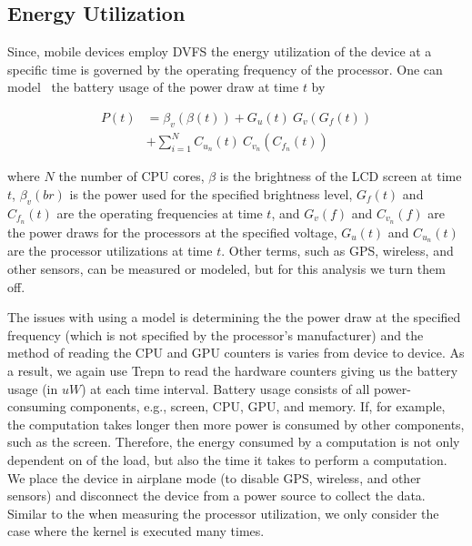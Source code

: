 \subsection{Energy Utilization}


Since, mobile devices employ DVFS
  the energy utilization of the device at a specific time is governed by
  the operating frequency of the processor.
One can model~\cite{zhang2010accurate, dong2011self} the battery usage of the power draw at time $t$ by

\begin{align*}
P(t) &= \beta_v(\beta(t)) + G_u(t) ~ G_v(G_f(t)) \\
     &+ \sum_{i=1}^{N} C_{u_n}(t) ~ C_{v_n}(C_{f_n}(t))
\end{align*}

where $N$ the number of CPU cores, $\beta$ is the brightness of the LCD screen at time $t$, $\beta_v(br)$ is the power used for the specified brightness level, $G_f(t)$ and $C_{f_n}(t)$ are the operating frequencies at time $t$, and $G_v(f)$ and $ C_{v_n}(f)$ are the power draws for the processors at the specified voltage, $G_u(t)$ and $C_{u_n}(t)$ are the processor utilizations at time $t$.
Other terms, such as GPS, wireless, and other sensors, can be measured or modeled, but for this analysis we turn them off.

The issues with using a model is determining the the power draw at the specified
  frequency (which is not specified by the processor's manufacturer) and the method of reading
  the CPU and GPU counters is varies from device to device.
As a result, we again use Trepn to read the hardware counters giving us the battery usage (in $uW$) at each time interval.
Battery usage consists of all power-consuming components, e.g., screen, CPU, GPU, and memory.
If, for example, the computation takes longer then more power is consumed by other components, such as the screen.
Therefore, the energy consumed by a computation is not only dependent on of the load, but also the time it takes to perform a computation.
We place the device in airplane mode (to disable GPS, wireless, and other sensors) and disconnect the device from a power source to 
  collect the data.
Similar to the when measuring the processor utilization, we only consider the case where the kernel is executed many times.

